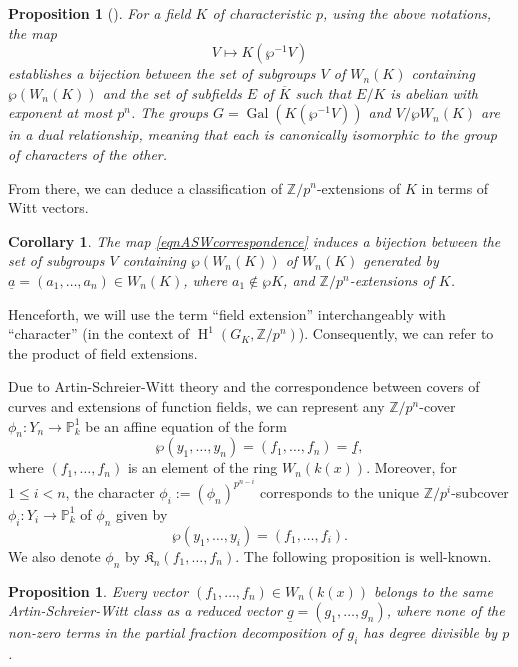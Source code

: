 \documentclass{compositio}
\newtheorem{proposition}[theorem]{Proposition}
\newtheorem{corollary}[theorem]{Corollary}
\theoremstyle{remark}
\theoremstyle{remark}
\DeclareMathOperator{\gal}{Gal}
\DeclareMathOperator{\cohom}{H}
\begin{document}
\begin{proposition}[{\cite[\S 26, Theorem 6]{MR2371763}}]
\label{propabelianpncorrespondence}
For a field $K$ of characteristic $p$, using the above notations, the map
\begin{equation}
\label{eqnASWcorrespondence}
V \mapsto K(\wp^{-1}V)
\end{equation}
establishes a bijection between the set of subgroups $V$ of $W_n(K)$ containing $\wp(W_n(K))$ and the set of subfields $E$ of $\overline{K}$ such that $E/K$ is abelian with exponent at most $p^n$. The groups $G=\gal(K(\wp^{-1}V))$ and $V/\wp W_n(K)$ are in a dual relationship, meaning that each is canonically isomorphic to the group of characters of the other.
\end{proposition}
From there, we can deduce a classification of $\mathbb{Z}/p^n$-extensions of $K$ in terms of Witt vectors.

\begin{corollary}
\label{coraswcycliccorrespondence}
    The map \eqref{eqnASWcorrespondence} induces a bijection between the set of subgroups $V$ containing $\wp( W_n(K))$ of $W_n(K)$ generated by $\underline{a}=(a_1, \ldots, a_n) \in W_n(K)$, where $a_1 \not\in \wp K$, and $\mathbb{Z}/p^n$-extensions of $K$.  
\end{corollary}

Henceforth, we will use the term ``field extension'' interchangeably with ``character'' (in the context of $ \cohom^1(G_K, \mathbb{Z}/p^n)$). Consequently, we can refer to the product of field extensions.


Due to Artin-Schreier-Witt theory and the correspondence between covers of curves and extensions of function fields, we can represent any $\mathbb{Z}/p^n$-cover $\phi_n: Y_n \to \mathbb{P}_k^1$ be an affine equation of the form
\begin{equation}
    \label{ASWeqn}
    \wp(y_1, \ldots, y_n)=(f_1, \ldots, f_n)=\underline{f},
\end{equation}
where $(f_1, \ldots, f_n)$ is an element of the ring $W_n(k(x))$. Moreover, for $1 \leq i < n$, the character $\phi_i:=(\phi_n)^{p^{n-i}}$ corresponds to the unique $\mathbb{Z}/p^i$-subcover $\phi_i: Y_i \to \mathbb{P}_k^1$ of $\phi_n$ given by
\begin{equation}
\label{eqnASWsub}
\wp(y_1, \ldots, y_i)=(f_1, \ldots, f_i).
\end{equation}
We also denote $\phi_n$ by $\mathfrak{K}_{n}(f_1, \ldots, f_n)$. The following proposition is well-known.
\begin{proposition}
\label{propreducedform}
    Every vector $(f_1, \ldots, f_n) \in W_n(k(x))$ belongs to the same Artin-Schreier-Witt class as a reduced vector $\underline{g}=(g_1, \ldots, g_n)$, where none of the non-zero terms in the partial fraction decomposition of $g_i$ has degree divisible by $p$.
\end{proposition}
\end{document}
